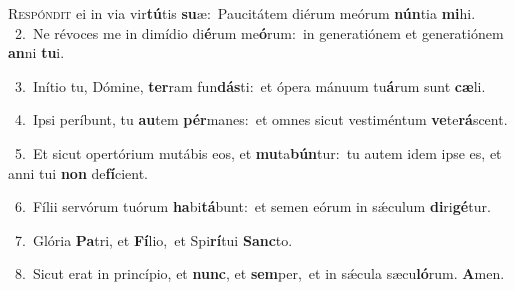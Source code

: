 \lettrine{\initial\textcolor{\initialcolor}{R}}{espóndit} ei in via vir\-\textbf{tú}\-tis \textbf{su}\-æ:~\star Paucitátem diérum meórum \textbf{nún}\-tia \textbf{mi}\-hi.\\
{\numbfont\textcolor{\numbcolor}{~2.}}~Ne révoces me in dimídio di\-\textbf{é}\-rum me\-\textbf{ó}\-rum:~\star in generatiónem et generatiónem \textbf{an}\-ni \textbf{tu}\-i.\par
{\numbfont\textcolor{\numbcolor}{~3.}}~Inítio tu, Dómine, \textbf{ter}\-ram fun\-\textbf{dás}\-ti:~\star et ópera mánuum tu\-\textbf{á}\-rum sunt \textbf{cæ}\-li.\par
{\numbfont\textcolor{\numbcolor}{~4.}}~Ipsi períbunt, tu \textbf{au}\-tem \textbf{pér}\-manes:~\star et omnes sicut vestiméntum \textbf{ve}\-te\-\textbf{rá}\-scent.\par
{\numbfont\textcolor{\numbcolor}{~5.}}~Et sicut opertórium mutábis eos, et \textbf{mu}\-ta\-\textbf{bún}\-tur:~\star tu autem idem ipse es, et anni tui \textbf{non} de\-\textbf{fí}\-cient.\par
{\numbfont\textcolor{\numbcolor}{~6.}}~Fílii servórum tuórum \textbf{ha}\-bi\-\textbf{tá}\-bunt:~\star et semen eórum in sǽculum \textbf{di}\-ri\-\textbf{gé}\-tur.\par
{\numbfont\textcolor{\numbcolor}{~7.}}~Glória \textbf{Pa}\-tri, et \textbf{Fí}\-lio,~\star et Spi\-\textbf{rí}\-tui \textbf{Sanc}\-to.\par
{\numbfont\textcolor{\numbcolor}{~8.}}~Sicut erat in princípio, et \textbf{nunc}\-, et \textbf{sem}\-per,~\star et in sǽcula sæcu\-\textbf{ló}\-rum. \textbf{A}\-men.\par
